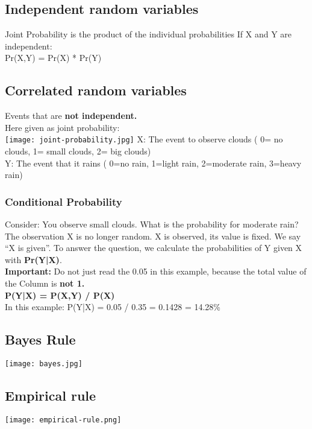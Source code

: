 \subsection{Independent random variables}
Joint Probability is the product of the individual probabilities
If X and Y are independent:\\
Pr(X,Y) = Pr(X) * Pr(Y)

\subsection{Correlated random variables}
Events that are \textbf{not independent.}\\
Here given as joint probability:\\
\texttt{[image: joint-probability.jpg]}
X: The event to observe clouds ( 0= no clouds, 1= small clouds, 2= big clouds)\\
Y: The event that it rains ( 0=no rain, 1=light rain, 2=moderate rain, 3=heavy rain)

\subsubsection{Conditional Probability}
Consider: You observe small clouds. What is the probability for moderate rain?
The observation X is no longer random. X is observed, its value is fixed. We say ``X is given''.
To answer the question, we calculate the probabilities of Y given X with \textbf{Pr(Y|X)}.\\
\textbf{Important:} Do not just read the 0.05 in this example, because the total value of the Column is \textbf{not 1.}\\
\textbf{P(Y|X) = P(X,Y) / P(X)}\\
In this example: P(Y|X) = 0.05 / 0.35 = 0.1428 = 14.28\%

\subsection{Bayes Rule}
\texttt{[image: bayes.jpg]}


\subsection{Empirical rule}
\texttt{[image: empirical-rule.png]}